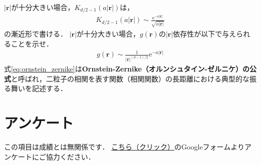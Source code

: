 \documentclass[a4paper,12pt]{jsarticle}
\begin{document}
$|\bm{r}|$が十分大きい場合，$K_{d/2-1}(a|\bm{r}|)$は，
\begin{align}
    K_{d/2-1}(a|\bm{r}|)
    \sim
    \frac{\mathrm{e}^{-a|\bm{r}|}}{\sqrt{a|\bm{r}|}}
\end{align}
の漸近形で書ける．
$|\bm{r}|$が十分大きい場合，$g(\bm{r})$の$|\bm{r}|$依存性が以下で与えられることを示せ．
\begin{align}
\label{eq:ornstein_zernike}
    g(\bm{r})
    \sim
    \frac{1}{|\bm{r}|^{(d-1)/2}}
    \mathrm{e}^{-a|\bm{r}|}
\end{align}
式\eqref{eq:ornstein_zernike}は{\bf Ornstein-Zernike（オルンシュタイン-ゼルニケ）の公式}と呼ばれ，二粒子の相関を表す関数（相関関数）の長距離における典型的な振る舞いを記述する．


\section*{アンケート}

この項目は成績とは無関係です．
\href{https://forms.gle/45Znp8u4y9uLkKJA8}{こちら（クリック）}のGoogleフォームよりアンケートにご協力ください．

%
%
\end{document}
